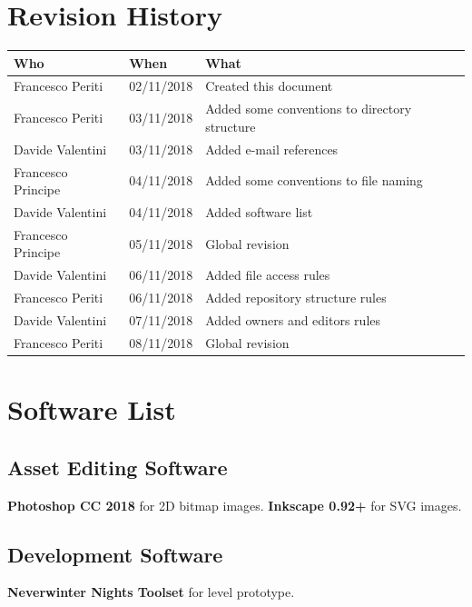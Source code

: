 \documentclass[12pt]{article}
\begin{document}
\clearpage

\section*{Revision History}
\begin{table}[H]
\centering
  \begin{tabularx}{\textwidth}{|l|l|X|}
\hline
\cellcolor{lightgray}\textbf{Who} & \cellcolor{lightgray}\textbf{When} & \cellcolor{lightgray}\textbf{What} \\ \hline
Francesco Periti & 02/11/2018 & Created this document \\ \hline
Francesco Periti & 03/11/2018 & Added some conventions to directory structure \\ \hline
Davide Valentini & 03/11/2018 & Added e-mail references \\ \hline
Francesco Principe & 04/11/2018 & Added some conventions to file naming \\ \hline
Davide Valentini & 04/11/2018 & Added software list \\ \hline
Francesco Principe & 05/11/2018 & Global revision \\ \hline
Davide Valentini & 06/11/2018 & Added file access rules \\ \hline
Francesco Periti & 06/11/2018 & Added repository structure rules \\ \hline
Davide Valentini & 07/11/2018 & Added owners and editors rules \\ \hline
Francesco Periti & 08/11/2018 & Global revision \\ \hline
\end{tabularx}
\end{table}

\clearpage

\section{Software List}

\subsection{Asset Editing Software}
\textbf{Photoshop CC 2018} for 2D bitmap images.
\textbf{Inkscape 0.92+} for SVG images.

\subsection{Development Software}
\textbf{Neverwinter Nights Toolset} for level prototype.
\end{document}

